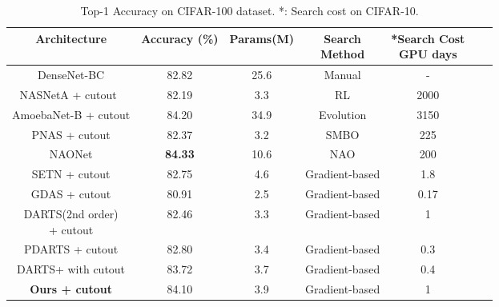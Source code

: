 \documentclass[10pt,a4paper,conference]{IEEEtran}
\begin{document}
\begin{table*}[tbp]
    \centering
    \begin{tabular}{c|c|c|c|ccc}
    \toprule
    Architecture & Accuracy (\%) & Params(M) & \makecell{Search \\ Method} &  \makecell{*Search Cost \\ GPU days}\\
    \midrule
   DenseNet-BC \cite{huang2017densely:25} & 82.82 & 25.6 & Manual & -\\
   \hline
NASNetA + cutout\ \cite{zoph2018learning:1} & 82.19 & 3.3 & RL & 2000\\
AmoebaNet-B + cutout \cite{RealAggarwalHuangLe2018:5} & 84.20 & 34.9 & Evolution & 3150\\
PNAS  + cutout \cite{Liu_2018:4}& 82.37 & 3.2 & SMBO & 225\\
NAONet \cite{luo2018neural:9}  & \textbf{84.33} & 10.6 & NAO & 200\\
\hline
SETN + cutout \cite{dong2019one:12} & 82.75 & 4.6 & Gradient-based & 1.8\\
GDAS + cutout \cite{dong2019searching:13}  & 80.91 & 2.5 & Gradient-based & 0.17\\
\makecell{DARTS(2nd order) \\ + cutout \cite{liu2018darts:6}} & 82.46 & 3.3 & Gradient-based & 1\\
PDARTS + cutout \cite{chen2019progressive:18} & 82.80  & 3.4 & Gradient-based & 0.3\\
DARTS+ with cutout \cite{liang2019darts+:19}   & 83.72 & 3.7 & Gradient-based & 0.4 \\
\hline
\textbf{Ours + cutout}  & 84.10 & 3.9 & Gradient-based & 1 \\
    \bottomrule
    \end{tabular}
    \caption{Top-1 Accuracy on CIFAR-100 dataset. *: Search cost on CIFAR-10.}
    \label{tab:cifar100}
\end{table*}
\end{document}
